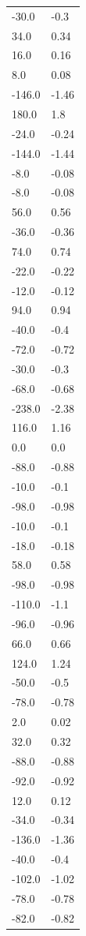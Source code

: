 \begin{longtable}{ll}
-30.0 & -0.3 \\
34.0 & 0.34 \\
16.0 & 0.16 \\
8.0 & 0.08 \\
-146.0 & -1.46 \\
180.0 & 1.8 \\
-24.0 & -0.24 \\
-144.0 & -1.44 \\
-8.0 & -0.08 \\
-8.0 & -0.08 \\
56.0 & 0.56 \\
-36.0 & -0.36 \\
74.0 & 0.74 \\
-22.0 & -0.22 \\
-12.0 & -0.12 \\
94.0 & 0.94 \\
-40.0 & -0.4 \\
-72.0 & -0.72 \\
-30.0 & -0.3 \\
-68.0 & -0.68 \\
-238.0 & -2.38 \\
116.0 & 1.16 \\
0.0 & 0.0 \\
-88.0 & -0.88 \\
-10.0 & -0.1 \\
-98.0 & -0.98 \\
-10.0 & -0.1 \\
-18.0 & -0.18 \\
58.0 & 0.58 \\
-98.0 & -0.98 \\
-110.0 & -1.1 \\
-96.0 & -0.96 \\
66.0 & 0.66 \\
124.0 & 1.24 \\
-50.0 & -0.5 \\
-78.0 & -0.78 \\
2.0 & 0.02 \\
32.0 & 0.32 \\
-88.0 & -0.88 \\
-92.0 & -0.92 \\
12.0 & 0.12 \\
-34.0 & -0.34 \\
-136.0 & -1.36 \\
-40.0 & -0.4 \\
-102.0 & -1.02 \\
-78.0 & -0.78 \\
-82.0 & -0.82 \\

\end{longtable}
